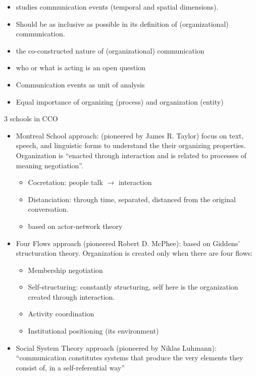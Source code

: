 \documentclass[
]{book}
\providecommand{\tightlist}{%
  \setlength{\itemsep}{0pt}\setlength{\parskip}{0pt}}
\begin{document}
\begin{itemize}
\tightlist
\item
  studies communication events (temporal and spatial dimensions).
\item
  Should be as inclusive as possible in its definition of (organizational) communication.
\item
  the co-constructed nature of (organizational) communication
\item
  who or what is acting is an open question
\item
  Communication events as unit of analysis
\item
  Equal importance of organizing (process) and organization (entity)
\end{itemize}

3 schools in CCO

\begin{itemize}
\item
  Montreal School approach: (pioneered by James R. Taylor) focus on text, speech, and linguistic forms to understand
  the their organizing properties. Organization is ``enacted through interaction and is related to processes of meaning
  negotiation''.

  \begin{itemize}
  \tightlist
  \item
    Cocretation: people talk \(\to\) interaction
  \item
    Distanciation: through time, separated, distanced from the original conversation.
  \item
    based on actor-network theory
  \end{itemize}
\item
  Four Flows approach (pioneered Robert D. McPhee): based on Giddens' structuration theory. Organization is created
  only when there are four flows:

  \begin{itemize}
  \tightlist
  \item
    Membership negotiation
  \item
    Self-structuring: constantly structuring, self here is the organization created through interaction.
  \item
    Activity coordination
  \item
    Institutional positioning (its environment)
  \end{itemize}
\item
  Social System Theory approach (pioneered by Niklas Luhmann): ``communication constitutes systems that produce the
  very elements they consist of, in a self-referential way''
\end{itemize}
\end{document}
